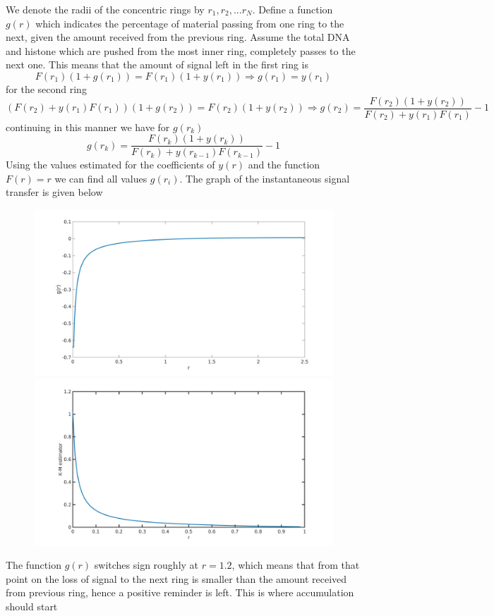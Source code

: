 \documentclass[12pt]{report}
\begin{document}
We denote the radii of the concentric rings by $r_1,r_2,...r_N$. Define a function $g(r)$ which indicates the percentage of material passing from one ring to the next, given the amount received from the previous ring. Assume the total DNA and histone which are pushed from the most inner ring, completely  passes to the next one. This means that the amount of signal left in the first ring is
\begin{equation*}
F(r_1)(1+g(r_1)) = F(r_1)(1+y(r_1)) \Rightarrow g(r_1)=y(r_1)
\end{equation*}
for the second ring 
\begin{equation*}
(F(r_2)+y(r_1)F(r_1))(1+g(r_2))= F(r_2)(1+y(r_2))\Rightarrow g(r_2)=\frac{F(r_2)(1+y(r_2))}{F(r_2)+y(r_1)F(r_1)} -1
\end{equation*}
continuing in this manner we have for $g(r_k)$
\begin{equation*}
g(r_k) =\frac{F(r_k)(1+y(r_k))}{F(r_k)+y(r_{k-1})F(r_{k-1})} -1
\end{equation*} 
Using the values estimated for the coefficients of $y(r)$ and the function $F(r)=r$  we can find all values $g(r_i)$. 
The graph of the instantaneous signal transfer is given below  

\begin{figure}[H]
\includegraphics[width=0.5\linewidth, height=0.3\textheight]{Images/patchExpansion/instantaneousLossGainFunction}
\includegraphics[width=0.5\linewidth, height=0.3\textheight]{Images/patchExpansion/KMEstimatorForSignalLoss}
\caption{}
\label{fig:instantaneousLossGainFunction}
\end{figure}
The function $g(r)$ switches sign roughly at $r=1.2$, which means that from that point on the loss of signal to the next ring is smaller than the amount received from previous ring, hence a positive reminder is left. This is where accumulation should start
\end{document}
